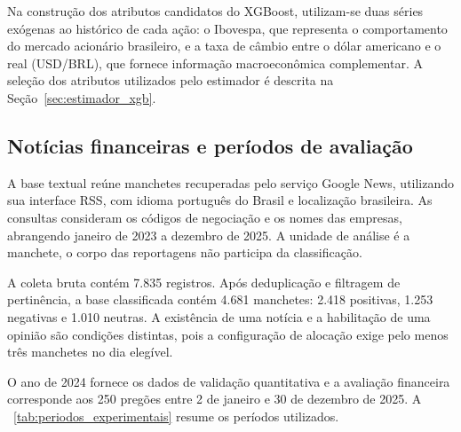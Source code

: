 \newpage Na construção dos atributos candidatos do XGBoost,
utilizam-se duas séries exógenas ao histórico de cada ação:
o Ibovespa, que representa o comportamento do mercado
acionário brasileiro, e a taxa de câmbio entre o dólar
americano e o real (USD/BRL), que fornece informação
macroeconômica complementar. A seleção dos atributos
utilizados pelo estimador é descrita na
Seção~\ref{sec:estimador_xgb}.

\subsection{Notícias financeiras e períodos de avaliação}

A base textual reúne manchetes recuperadas pelo serviço
Google News, utilizando sua interface RSS, com idioma
português do Brasil e localização brasileira. As consultas
consideram os códigos de negociação e os nomes das
empresas, abrangendo janeiro de 2023 a dezembro de 2025.
A unidade de análise é a manchete, o corpo das reportagens
não participa da classificação.

A coleta bruta contém 7.835 registros. Após deduplicação
e filtragem de pertinência, a base classificada contém
4.681 manchetes: 2.418 positivas, 1.253 negativas e
1.010 neutras. A existência de uma notícia e a habilitação
de uma opinião são condições distintas, pois a configuração
de alocação exige pelo menos três manchetes no dia
elegível.

O ano de 2024 fornece os dados de validação quantitativa
e a avaliação financeira corresponde aos 250 pregões
entre 2 de janeiro e 30 de dezembro de 2025. A
~\ref{tab:periodos_experimentais} resume os períodos
utilizados.


